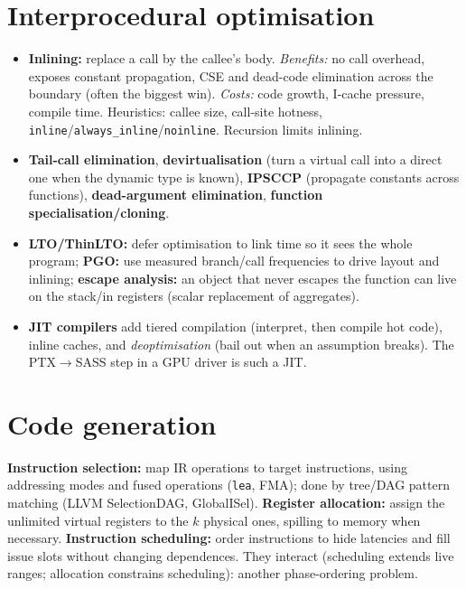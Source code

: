 \documentclass[10pt,a4paper,openany,oneside]{report}
\newcommand{\prio}[1]{\texorpdfstring{\ifcase#1\or{\color{gold}\ding{72}}\or{\color{gold}\ding{72}\ding{72}}\or{\color{gold}\ding{72}\ding{72}\ding{72}}\fi}{}}
\begin{document}
\section{Interprocedural optimisation \prio{2}}
\begin{itemize}[nosep]
\item \textbf{Inlining:} replace a call by the callee's body. \emph{Benefits:} no call overhead, exposes constant propagation, CSE and dead-code elimination across the boundary (often the biggest win). \emph{Costs:} code growth, I-cache pressure, compile time. Heuristics: callee size, call-site hotness, \texttt{inline}/\texttt{always\_inline}/\texttt{noinline}. Recursion limits inlining.
\item \textbf{Tail-call elimination}, \textbf{devirtualisation} (turn a virtual call into a direct one when the dynamic type is known), \textbf{IPSCCP} (propagate constants across functions), \textbf{dead-argument elimination}, \textbf{function specialisation/cloning}.
\item \textbf{LTO/ThinLTO:} defer optimisation to link time so it sees the whole program; \textbf{PGO:} use measured branch/call frequencies to drive layout and inlining; \textbf{escape analysis:} an object that never escapes the function can live on the stack/in registers (scalar replacement of aggregates).
\item \textbf{JIT compilers} add tiered compilation (interpret, then compile hot code), inline caches, and \emph{deoptimisation} (bail out when an assumption breaks). The PTX$\to$SASS step in a GPU driver is such a JIT.
\end{itemize}

\section{Code generation \prio{3}}
\begin{mustbox}
\textbf{Instruction selection:} map IR operations to target instructions, using addressing modes and fused operations (\texttt{lea}, FMA); done by tree/DAG pattern matching (LLVM SelectionDAG, GlobalISel). \textbf{Register allocation:} assign the unlimited virtual registers to the $k$ physical ones, spilling to memory when necessary. \textbf{Instruction scheduling:} order instructions to hide latencies and fill issue slots without changing dependences. They interact (scheduling extends live ranges; allocation constrains scheduling): another phase-ordering problem.
\end{mustbox}
\end{document}
